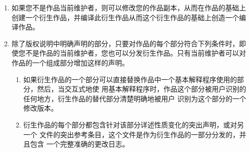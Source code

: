 \begin{LPPLicense}
\begin{enumerate}
        \item 如果您不是作品当前维护者，则可以修改您的作品副本，从而在作品的基础上创建一个衍生作品，并编译此衍生作品从而这个衍生作品的基础上创造一个编译作品。
        \item\label{LPPL:item:conditions} 除了版权说明中明确声明的部分，只要对作品的每个部分符合下列条件时，即使您不是作品的当前维护者，您也可以分发衍生作品。只有当前维护者可以对作品的一个组成部分增加这样的声明。
            \begin{enumerate}
                \item 如果衍生作品的一个部分可以直接替换作品中一个基本解释程序使用的部分，然后，当交互式地使 用基本解释程序时，作品这个部分被用户识别的任何地方，衍生作品的替代部分清楚明确地被用户 识别为这个部分的一个修改版本。
                \item 衍生作品的每个部分都包含针对该部分详述性质变化的突出声明，或对另一个 文件的突出参考条目，这个文件是作为衍生作品的一部分分发的，并且包含 一个完整准确的更改日志。

\end{enumerate}
\end{enumerate}
\end{LPPLicense}
